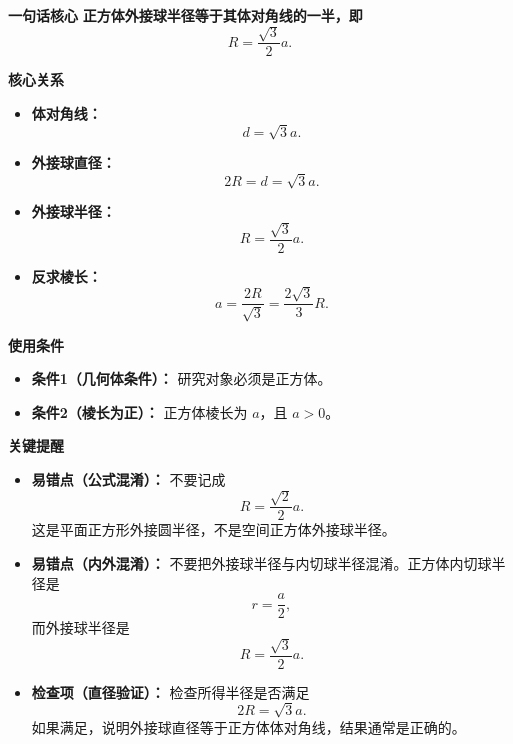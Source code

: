 \begin{summarybox}
	\textbf{\textcolor{CSummary}{一句话核心}}
	\textbf{正方体外接球半径等于其体对角线的一半，即}
	\[
		R=\frac{\sqrt{3}}{2}a.
	\]

	\medskip
	\textbf{\textcolor{CSummary}{核心关系}}

	\begin{itemize}[leftmargin=*, itemsep=0.5em, topsep=0.4em]
		\item \textbf{体对角线：}
		      \[
			      d=\sqrt{3}a.
		      \]

		\item \textbf{外接球直径：}
		      \[
			      2R=d=\sqrt{3}a.
		      \]

		\item \textbf{外接球半径：}
		      \[
			      R=\frac{\sqrt{3}}{2}a.
		      \]

		\item \textbf{反求棱长：}
		      \[
			      a=\frac{2R}{\sqrt{3}}=\frac{2\sqrt{3}}{3}R.
		      \]
	\end{itemize}

	\medskip
	\textbf{\textcolor{CSummary}{使用条件}}

	\begin{itemize}[leftmargin=*, itemsep=0.5em, topsep=0.4em]
		\item \textbf{条件1（几何体条件）：} 研究对象必须是正方体。
		\item \textbf{条件2（棱长为正）：} 正方体棱长为 $a$，且 $a>0$。
	\end{itemize}

	\medskip
	\textbf{\textcolor{CSummary}{关键提醒}}

	\begin{itemize}[leftmargin=*, itemsep=0.5em, topsep=0.4em]
		\item \textbf{易错点（公式混淆）：} 不要记成
		      \[
			      R=\frac{\sqrt{2}}{2}a.
		      \]
		      这是平面正方形外接圆半径，不是空间正方体外接球半径。

		\item \textbf{易错点（内外混淆）：} 不要把外接球半径与内切球半径混淆。正方体内切球半径是
		      \[
			      r=\frac{a}{2},
		      \]
		      而外接球半径是
		      \[
			      R=\frac{\sqrt{3}}{2}a.
		      \]

		\item \textbf{检查项（直径验证）：} 检查所得半径是否满足
		      \[
			      2R=\sqrt{3}a.
		      \]
		      如果满足，说明外接球直径等于正方体体对角线，结果通常是正确的。
	\end{itemize}
\end{summarybox}